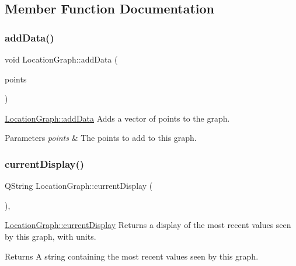 \subsection{Member Function Documentation}
\hypertarget{class_location_graph_a7cfae63bd0a39bb8f6953053d11d7794}{}\label{class_location_graph_a7cfae63bd0a39bb8f6953053d11d7794} 
\subsubsection{\texorpdfstring{add\+Data()}{addData()}}
{\footnotesize\ttfamily void Location\+Graph\+::add\+Data (\begin{DoxyParamCaption}\item[{std\+::vector$<$ Q\+PointF $>$}]{points }\end{DoxyParamCaption})}



\hyperlink{class_location_graph_a7cfae63bd0a39bb8f6953053d11d7794}{Location\+Graph\+::add\+Data} Adds a vector of points to the graph. 


\begin{DoxyParams}{Parameters}
{\em points} & The points to add to this graph. \\
\hline
\end{DoxyParams}
\hypertarget{class_location_graph_ab0f46de5c3a6b72556762bbf02d6a4b3}{}\label{class_location_graph_ab0f46de5c3a6b72556762bbf02d6a4b3} 
\subsubsection{\texorpdfstring{current\+Display()}{currentDisplay()}}
{\footnotesize\ttfamily Q\+String Location\+Graph\+::current\+Display (\begin{DoxyParamCaption}{ }\end{DoxyParamCaption})\hspace{0.3cm}{\ttfamily [override]}, {\ttfamily [virtual]}}



\hyperlink{class_location_graph_ab0f46de5c3a6b72556762bbf02d6a4b3}{Location\+Graph\+::current\+Display} Returns a display of the most recent values seen by this graph, with units. 

\begin{DoxyReturn}{Returns}
A string containing the most recent values seen by this graph. 
\end{DoxyReturn}



